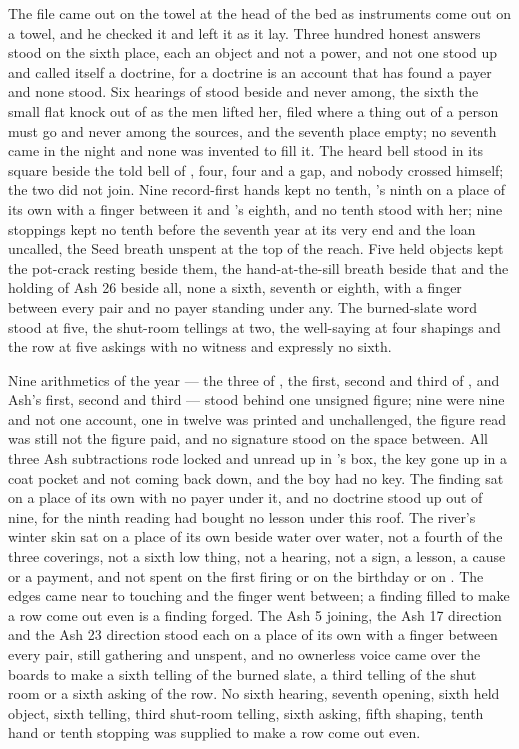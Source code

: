 \scenebreak

The file came out on the towel at the head of the bed as instruments come out on a towel, and he checked it and left it as it lay. Three hundred honest answers stood on the sixth place, each an object and not a power, and not one stood up and called itself a doctrine, for a doctrine is an account that has found a payer and none stood. Six hearings of  stood beside and never among, the sixth the small flat knock out of  as the men lifted her, filed where a thing out of a person must go and never among the sources, and the seventh place empty; no seventh came in the night and none was invented to fill it. The heard bell stood in its square beside the told bell of , four, four and a gap, and nobody crossed himself; the two did not join. Nine record-first hands kept no tenth, 's ninth on a place of its own with a finger between it and 's eighth, and no tenth stood with her; nine stoppings kept no tenth before the seventh year at its very end and the loan uncalled, the Seed breath unspent at the top of the reach. Five held objects kept the pot-crack resting beside them, the hand-at-the-sill breath beside that and the holding of Ash 26 beside all, none a sixth, seventh or eighth, with a finger between every pair and no payer standing under any. The burned-slate word stood at five, the shut-room tellings at two, the well-saying at four shapings and the row at five askings with no witness and expressly no sixth.

Nine arithmetics of the year --- the three of , the first, second and third of , and Ash's first, second and third --- stood behind one unsigned figure; nine were nine and not one account, one in twelve was printed and unchallenged, the figure read was still not the figure paid, and no signature stood on the space between. All three Ash subtractions rode locked and unread up  in 's box, the key gone up in a coat pocket and not coming back down, and the boy had no key. The finding sat on a place of its own with no payer under it, and no doctrine stood up out of nine, for the ninth reading had bought no lesson under this roof. The river's winter skin sat on a place of its own beside water over water, not a fourth of the three coverings, not a sixth low thing, not a hearing, not a sign, a lesson, a cause or a payment, and not spent on the first firing or on the birthday or on . The edges came near to touching and the finger went between; a finding filled to make a row come out even is a finding forged. The Ash 5 joining, the Ash 17 direction and the Ash 23 direction stood each on a place of its own with a finger between every pair, still gathering and unspent, and no ownerless voice came over the boards to make a sixth telling of the burned slate, a third telling of the shut room or a sixth asking of the row. No sixth hearing, seventh opening, sixth held object, sixth telling, third shut-room telling, sixth asking, fifth shaping, tenth hand or tenth stopping was supplied to make a row come out even.

